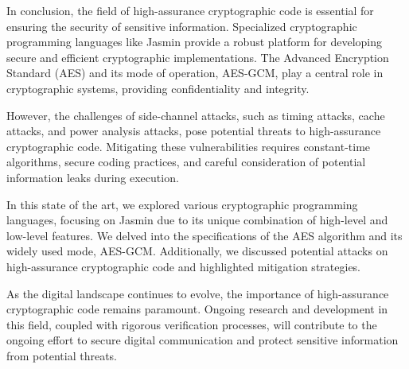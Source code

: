 \documentclass[runningheads]{llncs}
\begin{document}
In conclusion, the field of high-assurance cryptographic code is essential for ensuring the security of sensitive information. Specialized cryptographic programming languages like Jasmin provide a robust platform for developing secure and efficient cryptographic implementations. The Advanced Encryption Standard (AES) and its mode of operation, AES-GCM, play a central role in cryptographic systems, providing confidentiality and integrity.

However, the challenges of side-channel attacks, such as timing attacks, cache attacks, and power analysis attacks, pose potential threats to high-assurance cryptographic code. Mitigating these vulnerabilities requires constant-time algorithms, secure coding practices, and careful consideration of potential information leaks during execution.

In this state of the art, we explored various cryptographic programming languages, focusing on Jasmin due to its unique combination of high-level and low-level features. We delved into the specifications of the AES algorithm and its widely used mode, AES-GCM. Additionally, we discussed potential attacks on high-assurance cryptographic code and highlighted mitigation strategies.

As the digital landscape continues to evolve, the importance of high-assurance cryptographic code remains paramount. Ongoing research and development in this field, coupled with rigorous verification processes, will contribute to the ongoing effort to secure digital communication and protect sensitive information from potential threats.
\end{document}

